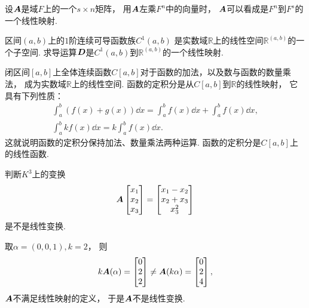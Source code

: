 \begin{example}
设\(\boldsymbol{A}\)是域\(F\)上的一个\(s \times n\)矩阵，
用\(\boldsymbol{A}\)左乘\(F^n\)中的向量时，
\(\boldsymbol{A}\)可以看成是\(F^n\)到\(F^s\)的一个线性映射.
\end{example}

\begin{example}
区间\((a,b)\)上的\(1\)阶连续可导函数族\(C^1(a,b)\)
是实数域\(\mathbb{R}\)上的线性空间\(\mathbb{R}^{(a,b)}\)的一个子空间.
求导运算\(\boldsymbol{D}\)是\(C^1(a,b)\)到\(\mathbb{R}^{(a,b)}\)的一个线性映射.
\end{example}

\begin{example}
闭区间\([a,b]\)上全体连续函数\(C[a,b]\)对于函数的加法，以及数与函数的数量乘法，
成为实数域\(\mathbb{R}\)上的线性空间.
函数的定积分是从\(C[a,b]\)到\(\mathbb{R}\)的线性映射，
它具有下列性质：\begin{gather*}
	\int_a^b (f(x) + g(x)) \dd{x}
	= \int_a^b f(x) \dd{x} + \int_a^b f(x) \dd{x}, \\
	\int_a^b k f(x) \dd{x}
	= k \int_a^b f(x) \dd{x}.
\end{gather*}
这就说明函数的定积分保持加法、数量乘法两种运算.
函数的定积分是\(C[a,b]\)上的线性函数.
\end{example}

\begin{example}
判断\(K^3\)上的变换\[
	\boldsymbol{A}
	\begin{bmatrix}
		x_1 \\ x_2 \\ x_3
	\end{bmatrix}
	= \begin{bmatrix}
		x_1 - x_2 \\
		x_2 + x_3 \\
		x_3^2
	\end{bmatrix}
\]是不是线性变换.
\begin{solution}
取\(\alpha=(0,0,1),
k=2\)，
则\[
	k\boldsymbol{A}(\alpha)
	= \begin{bmatrix}
		0 \\ 2 \\ 2
	\end{bmatrix}
	\neq
	\boldsymbol{A}(k\alpha)
	= \begin{bmatrix}
		0 \\ 2 \\ 4
	\end{bmatrix},
\]
\(\boldsymbol{A}\)不满足线性映射的定义，
于是\(\boldsymbol{A}\)不是线性变换.
\end{solution}
\end{example}

